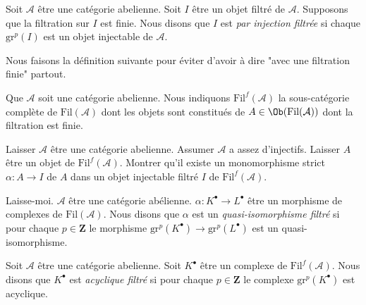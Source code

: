 \begin{definition}
\label{definition-injective-filtered}
Soit $\mathcal{A}$ être une catégorie abelienne. Soit
$I$ être un objet filtré de $\mathcal{A}$. Supposons
que la filtration sur $I$ est finie.
Nous disons que $I$ est {\it par injection filtrée} si chaque $\text{gr}^p(I)$
est un objet injectable de $\mathcal{A}$.
\end{definition}

\noindent
Nous faisons la définition suivante pour éviter d'avoir à
dire "avec une filtration finie" partout.

\begin{definition}
\label{definition-finite-filtration-category}
Que $\mathcal{A}$ soit une catégorie
abelienne. Nous indiquons {\it $\text{Fil}^f(\mathcal{A})$} la sous-catégorie complète
de $\text{Fil}(\mathcal{A})$ dont les objets sont constitués
de $A \in \Ob(\text{Fil}(\mathcal{A}))$ dont la
filtration est finie.
\end{definition}

\begin{exercise}
\label{exercise-inject-into-injective}
Laisser $\mathcal{A}$ être une catégorie abelienne.
Assumer $\mathcal{A}$ a assez d'injectifs. Laisser
$A$ être un objet de $\text{Fil}^f(\mathcal{A})$. Montrer
qu'il existe un monomorphisme strict $\alpha : A \to
I$ de $A$ dans un objet injectable filtré $I$ de $\text{Fil}^f(\mathcal{A})$.
\end{exercise}

\begin{definition}
\label{definition-filtered-quasi-isomorphism}
Laisse-moi. $\mathcal{A}$ être une catégorie
abélienne. $\alpha : K^\bullet \to L^\bullet$ être un
morphisme de complexes de $\text{Fil}(\mathcal{A})$. Nous
disons que $\alpha$ est un {\it quasi-isomorphisme
filtré} si pour chaque $p
\in \mathbf{Z}$ le morphisme $\text{gr}^p(K^\bullet) \to \text{gr}^p(L^\bullet)$
est un quasi-isomorphisme.
\end{definition}

\begin{definition}
\label{definition-filtered-acyclic}
Soit $\mathcal{A}$ être une catégorie abelienne.
Soit $K^\bullet$ être un complexe de $\text{Fil}^f(\mathcal{A})$. Nous
disons que $K^\bullet$ est {\it acyclique filtré}
si pour chaque $p \in \mathbf{Z}$ le complexe $\text{gr}^p(K^\bullet)$ est
acyclique.
\end{definition}

